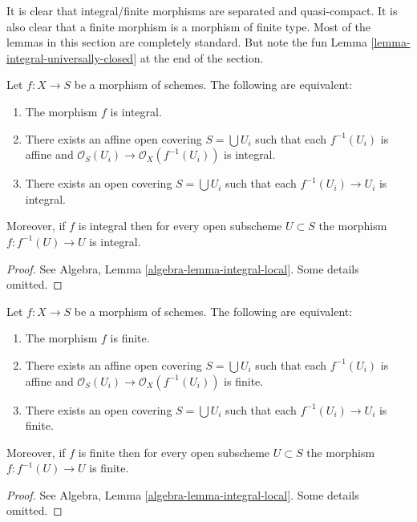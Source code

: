 \noindent
It is clear that integral/finite morphisms are separated and
quasi-compact. It is also clear that a finite morphism is a
morphism of finite type. Most of the lemmas in this section are
completely standard.
But note the fun Lemma \ref{lemma-integral-universally-closed}
at the end of the section.

\begin{lemma}
\label{lemma-integral-local}
Let $f : X \to S$ be a morphism of schemes.
The following are equivalent:
\begin{enumerate}
\item The morphism $f$ is integral.
\item There exists an affine open covering $S = \bigcup U_i$ such that
each $f^{-1}(U_i)$ is affine and
$\mathcal{O}_S(U_i) \to \mathcal{O}_X(f^{-1}(U_i))$ is integral.
\item There exists an open covering $S = \bigcup U_i$
such that each $f^{-1}(U_i) \to U_i$ is integral.
\end{enumerate}
Moreover, if $f$ is integral then for every open subscheme
$U \subset S$ the morphism $f : f^{-1}(U) \to U$ is integral.
\end{lemma}

\begin{proof}
See Algebra, Lemma \ref{algebra-lemma-integral-local}.
Some details omitted.
\end{proof}

\begin{lemma}
\label{lemma-finite-local}
Let $f : X \to S$ be a morphism of schemes.
The following are equivalent:
\begin{enumerate}
\item The morphism $f$ is finite.
\item There exists an affine open covering $S = \bigcup U_i$ such that
each $f^{-1}(U_i)$ is affine and
$\mathcal{O}_S(U_i) \to \mathcal{O}_X(f^{-1}(U_i))$ is finite.
\item There exists an open covering $S = \bigcup U_i$
such that each $f^{-1}(U_i) \to U_i$ is finite.
\end{enumerate}
Moreover, if $f$ is finite then for every open subscheme
$U \subset S$ the morphism $f : f^{-1}(U) \to U$ is finite.
\end{lemma}

\begin{proof}
See Algebra, Lemma \ref{algebra-lemma-integral-local}.
Some details omitted.
\end{proof}

